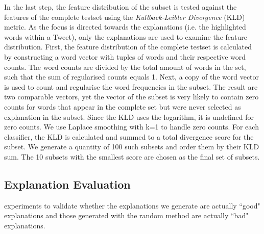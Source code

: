 In the last step, the feature distribution of the subset is tested against the features of the complete testset using the \textit{Kullback-Leibler Divergence} (KLD) metric. As the focus is directed towards the explanations (i.e. the highlighted words within a Tweet), only the explanations are used to examine the feature distribution. First, the feature distribution of the complete testset is calculated by constructing a word vector with tuples of words and their respective word counts. The word counts are divided by the total amount of words in the set, such that the sum of regularised counts equals 1. Next, a copy of the word vector is used to count and regularise the word frequencies in the subset. The result are two comparable vectors, yet the vector of the subset is very likely to contain zero counts for words that appear in the complete set but were never selected as explanation in the subset. Since the KLD uses the logarithm, it is undefined for zero counts. We use Laplace smoothing with k=1 to handle zero counts. For each classifier, the KLD is calculated and summed to a total divergence score for the subset.\newline
We generate a quantity of 100 such subsets and order them by their KLD sum. The 10 subsets with the smallest score are chosen as the final set of subsets.\newline




\subsection{Explanation Evaluation}
\label{subsec:expleval}
experiments to validate whether the explanations we generate are actually ``good" explanations and those generated with the random method are actually ``bad" explanations.

